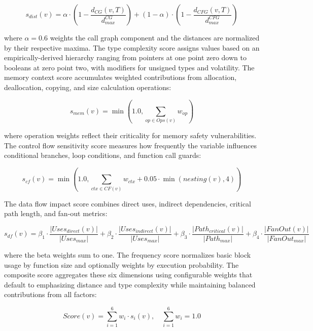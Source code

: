 \documentclass[review]{elsarticle}
\begin{document}
\begin{equation}
s_{dist}(v) = \alpha \cdot \left(1 - \frac{d_{CG}(v,T)}{d_{max}^{CG}}\right) + (1-\alpha) \cdot \left(1 - \frac{d_{CFG}(v,T)}{d_{max}^{CFG}}\right)
\end{equation}

where $\alpha = 0.6$ weights the call graph component and the distances are normalized by their respective maxima. The type complexity score assigns values based on an empirically-derived hierarchy ranging from pointers at one point zero down to booleans at zero point two, with modifiers for unsigned types and volatility. The memory context score accumulates weighted contributions from allocation, deallocation, copying, and size calculation operations:

\begin{equation}
s_{mem}(v) = \min\left(1.0, \sum_{op \in Ops(v)} w_{op}\right)
\end{equation}

where operation weights reflect their criticality for memory safety vulnerabilities. The control flow sensitivity score measures how frequently the variable influences conditional branches, loop conditions, and function call guards:

\begin{equation}
s_{cf}(v) = \min\left(1.0, \sum_{ctx \in CF(v)} w_{ctx} + 0.05 \cdot \min(nesting(v), 4)\right)
\end{equation}

The data flow impact score combines direct uses, indirect dependencies, critical path length, and fan-out metrics:

\begin{equation}
s_{df}(v) = \beta_1 \cdot \frac{|Uses_{direct}(v)|}{|Uses_{max}|} + \beta_2 \cdot \frac{|Uses_{indirect}(v)|}{|Uses_{max}|} + \beta_3 \cdot \frac{|Path_{critical}(v)|}{|Path_{max}|} + \beta_4 \cdot \frac{|FanOut(v)|}{|FanOut_{max}|}
\end{equation}

where the beta weights sum to one. The frequency score normalizes basic block usage by function size and optionally weights by execution probability. The composite score aggregates these six dimensions using configurable weights that default to emphasizing distance and type complexity while maintaining balanced contributions from all factors:

\begin{equation}
Score(v) = \sum_{i=1}^{6} w_i \cdot s_i(v), \quad \sum_{i=1}^{6} w_i = 1.0
\end{equation}
\end{document}
